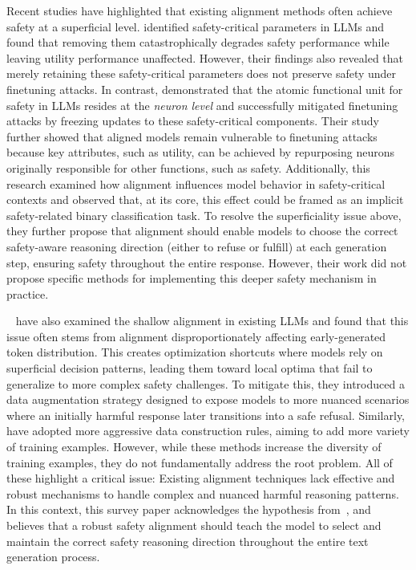 Recent studies have highlighted that existing alignment methods often achieve safety at a superficial level. \cite{wei2024assessing} identified safety-critical parameters in LLMs and found that removing them catastrophically degrades safety performance while leaving utility performance unaffected. However, their findings also revealed that merely retaining these safety-critical parameters does not preserve safety under finetuning attacks. In contrast, \cite{li2024superficial} demonstrated that the atomic functional unit for safety in LLMs resides at the \emph{neuron level} and successfully mitigated finetuning attacks by freezing updates to these safety-critical components. Their study further showed that aligned models remain vulnerable to finetuning attacks because key attributes, such as utility, can be achieved by repurposing neurons originally responsible for other functions, such as safety. Additionally, this research examined how alignment influences model behavior in safety-critical contexts and observed that, at its core, this effect could be framed as an implicit safety-related binary classification task. To resolve the superficiality issue above, they further propose that alignment should enable models to choose the correct safety-aware reasoning direction (either to refuse or fulfill) at each generation step, ensuring safety throughout the entire response. 
However, their work did not propose specific methods for implementing this deeper safety mechanism in practice.

~\cite{qi2024ai} have also examined the shallow alignment in existing LLMs and found that this issue often stems from alignment disproportionately affecting early-generated token distribution. This creates optimization shortcuts where models rely on superficial decision patterns, leading them toward local optima that fail to generalize to more complex safety challenges. To mitigate this, they introduced a data augmentation strategy designed to expose models to more nuanced scenarios where an initially harmful response later transitions into a safe refusal. Similarly,~\cite{yuan2024refuse} have adopted more aggressive data construction rules, aiming to add more variety of training examples. However, while these methods increase the diversity of training examples, they do not fundamentally address the root problem. All of these highlight a critical issue: Existing alignment techniques lack effective and robust mechanisms to handle complex and nuanced harmful reasoning patterns. In this context, this survey paper acknowledges the hypothesis from~\cite{li2024superficial}, and believes that a robust safety alignment should teach the model to select and maintain the correct safety reasoning direction throughout the entire text generation process.
